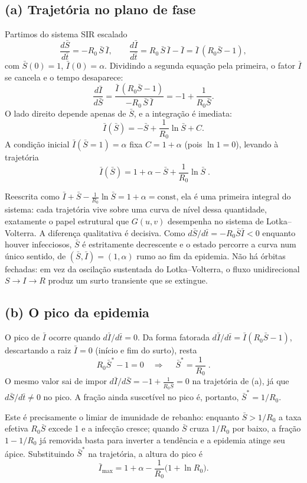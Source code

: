 \documentclass{article}
\begin{document}
\subsection*{(a) Trajetória no plano de fase}

Partimos do sistema SIR escalado
\[
\frac{d\bar S}{d\bar t} = -R_0\,\bar S\,\bar I,
\qquad
\frac{d\bar I}{d\bar t} = R_0\,\bar S\,\bar I - \bar I = \bar I\,(R_0\bar S - 1),
\]
com $\bar S(0)=1$, $\bar I(0)=\alpha$. Dividindo a segunda equação pela primeira, o fator $\bar I$ se cancela e o tempo desaparece:
\[
\frac{d\bar I}{d\bar S}
= \frac{\bar I\,(R_0\bar S - 1)}{-R_0\,\bar S\,\bar I}
= -1 + \frac{1}{R_0\bar S}.
\]
O lado direito depende apenas de $\bar S$, e a integração é imediata:
\[
\bar I(\bar S) = -\bar S + \frac{1}{R_0}\ln\bar S + C.
\]
A condição inicial $\bar I(\bar S=1)=\alpha$ fixa $C = 1+\alpha$ (pois $\ln 1 = 0$), levando à trajetória
\[
\boxed{\;\bar I(\bar S) = 1 + \alpha - \bar S + \frac{1}{R_0}\ln\bar S\;}.
\]

Reescrita como $\bar I + \bar S - \tfrac{1}{R_0}\ln\bar S = 1+\alpha = \text{const}$, ela é uma primeira integral do sistema: cada trajetória vive sobre uma curva de nível dessa quantidade, exatamente o papel estrutural que $G(u,v)$ desempenha no sistema de Lotka--Volterra. A diferença qualitativa é decisiva. Como $d\bar S/d\bar t = -R_0\bar S\bar I < 0$ enquanto houver infecciosos, $\bar S$ é estritamente decrescente e o estado percorre a curva num único sentido, de $(\bar S,\bar I)=(1,\alpha)$ rumo ao fim da epidemia. Não há órbitas fechadas: em vez da oscilação sustentada do Lotka--Volterra, o fluxo unidirecional $S\to I\to R$ produz um surto transiente que se extingue.

\subsection*{(b) O pico da epidemia}

O pico de $\bar I$ ocorre quando $d\bar I/d\bar t = 0$. Da forma fatorada $d\bar I/d\bar t = \bar I(R_0\bar S - 1)$, descartando a raiz $\bar I=0$ (início e fim do surto), resta
\[
R_0\bar S^* - 1 = 0 \quad\Longrightarrow\quad \boxed{\;\bar S^* = \frac{1}{R_0}\;}.
\]
O mesmo valor sai de impor $d\bar I/d\bar S=-1+\tfrac{1}{R_0\bar S}=0$ na trajetória de (a), já que $d\bar S/d\bar t\neq 0$ no pico. A fração ainda suscetível no pico é, portanto, $\bar S^* = 1/R_0$.

Este é precisamente o limiar de imunidade de rebanho: enquanto $\bar S > 1/R_0$ a taxa efetiva $R_0\bar S$ excede 1 e a infecção cresce; quando $\bar S$ cruza $1/R_0$ por baixo, a fração $1-1/R_0$ já removida basta para inverter a tendência e a epidemia atinge seu ápice. Substituindo $\bar S^*$ na trajetória, a altura do pico é
\[
\bar I_{\max} = 1 + \alpha - \frac{1}{R_0}\bigl(1 + \ln R_0\bigr).
\]
\end{document}
